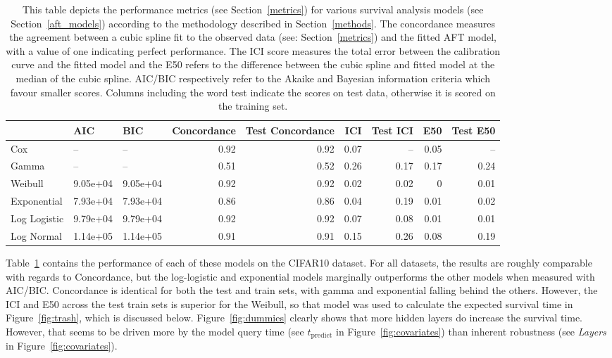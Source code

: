 \begin{table}
\centering
\begin{tabular}{lllrrrrrr}
\toprule
 & AIC & BIC & Concordance & Test Concordance & ICI & Test ICI & E50 & Test E50 \\
\midrule
Cox & -- & -- & 0.92 & 0.92 & 0.07 & -- & 0.05 & -- \\
Gamma & -- & -- & 0.51 & 0.52 & 0.26 & 0.17 & 0.17 & 0.24 \\
Weibull & 9.05e+04 & 9.05e+04 & 0.92 & 0.92 & 0.02 & 0.02 & 0 & 0.01 \\
Exponential & 7.93e+04 & 7.93e+04 & 0.86 & 0.86 & 0.04 & 0.19 & 0.01 & 0.02 \\
Log Logistic & 9.79e+04 & 9.79e+04 & 0.92 & 0.92 & 0.07 & 0.08 & 0.01 & 0.01 \\
Log Normal & 1.14e+05 & 1.14e+05 & 0.91 & 0.91 & 0.15 & 0.26 & 0.08 & 0.19 \\
\bottomrule
\end{tabular}
\caption{This table depicts the performance metrics (see Section~\ref{metrics}) for various survival analysis models (see Section~\ref{aft_models}) according to the methodology described in Section~\ref{methods}. 
The concordance measures the agreement between a cubic spline fit to the observed data
(see: Section~\ref{metrics}) and the fitted AFT model, with a value of one indicating perfect performance. 
The ICI score measures the total
error between the calibration curve and the fitted model and the E50 refers to the difference between the cubic spline
and fitted model at the median of the cubic spline. 
AIC/BIC respectively refer to the Akaike and Bayesian information criteria which
favour smaller scores. 
Columns including the word test indicate the scores on test data, otherwise it is scored on the training set.}
\label{tab:aft_summary}
\end{table}

Table~\ref{tab:aft_summary} contains the performance of each of these models on the CIFAR10 dataset. 
For all datasets, the results are roughly comparable with regards to Concordance, but the log-logistic and exponential models marginally outperforms the other models when measured with AIC/BIC\@. 
Concordance is identical for both the test and train sets, with gamma and exponential falling behind the others. 
However, the ICI  and E50  across the test train sets is superior for the Weibull, so that model was used to calculate the expected survival time in Figure~\ref{fig:trash}, which is discussed below. 
Figure~\ref{fig:dummies} clearly shows that more hidden layers do increase the survival time. 
However, that seems to be driven more by the model query time (see $t_{\mathrm{predict}}$ in Figure~\ref{fig:covariates}) than inherent robustness (see \textit{Layers} in Figure~\ref{fig:covariates}).

